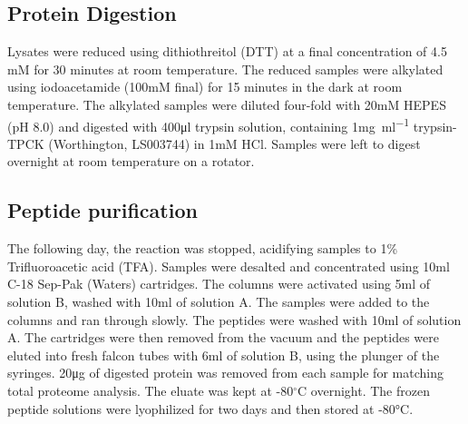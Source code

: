 \subsection{Protein Digestion}
Lysates were reduced using dithiothreitol (DTT) at a final concentration of 4.5 mM for 30 minutes at room temperature. The reduced samples were alkylated using iodoacetamide (100mM final) for 15 minutes in the dark at room temperature. The alkylated samples were diluted four-fold with 20mM HEPES (pH 8.0) and digested with 400\si{\ul} trypsin solution, containing 1\si{\mg\per\ml} trypsin-TPCK (Worthington, LS003744) in 1mM HCl. Samples were left to digest overnight at room temperature on a rotator.

\subsection{Peptide purification}
The following day, the reaction was stopped, acidifying samples to 1\% Trifluoroacetic acid (TFA). Samples were desalted and concentrated using 10ml C-18 Sep-Pak (Waters) cartridges. The columns were activated using 5ml of solution B, washed with 10ml of solution A. The samples were added to the columns and ran through slowly. The peptides were washed with 10ml of solution A. The cartridges were then removed from the vacuum and the peptides were eluted into fresh falcon tubes with 6ml of solution B, using the plunger of the syringes. 20\si{\ug} of digested protein was removed from each sample for matching total proteome analysis. The eluate was kept at -80$^{\circ}$C overnight. The frozen peptide solutions were lyophilized for two days and then stored at -80\si{\degreeCelsius}.
%

